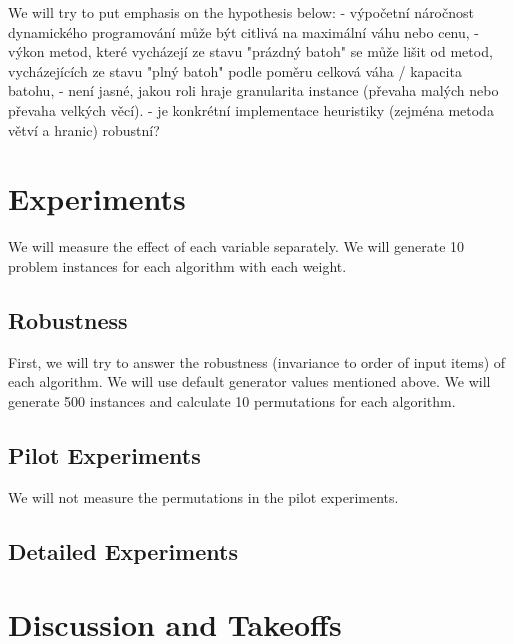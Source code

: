 \documentclass[a4paper,10pt]{article}
\begin{document}
We will try to put emphasis on the hypothesis below:
- výpočetní náročnost dynamického programování může být citlivá na maximální váhu nebo cenu,
- výkon metod, které vycházejí ze stavu "prázdný batoh" se může lišit od metod, vycházejících ze stavu "plný batoh" podle poměru celková váha / kapacita batohu,
- není jasné, jakou roli hraje granularita instance (převaha malých nebo převaha velkých věcí).
- je konkrétní implementace heuristiky (zejména metoda větví a hranic) robustní?

\section{Experiments}
We will measure the effect of each variable separately. We will generate 10 problem instances for each algorithm with each weight.

\subsection{Robustness}
First, we will try to answer the robustness (invariance to order of input items) of each algorithm. We will use default generator values mentioned above. We will generate 500 instances and calculate 10 permutations for each algorithm.

\subsection{Pilot Experiments}

 We will not measure the permutations in the pilot experiments.


\subsection{Detailed Experiments}


\section{Discussion and Takeoffs}
\end{document}
